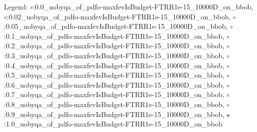 Legend: {{}$\circ$}:0.0\_uobyqa\_of\_pdfo-maxfevIsBudget-FTRR1e-15\_10000D\_on\_bbob, {{}$\circ$}:0.02\_uobyqa\_of\_pdfo-maxfevIsBudget-FTRR1e-15\_10000D\_on\_bbob, {{}$\circ$}:0.05\_uobyqa\_of\_pdfo-maxfevIsBudget-FTRR1e-15\_10000D\_on\_bbob, {{}$\circ$}:0.1\_uobyqa\_of\_pdfo-maxfevIsBudget-FTRR1e-15\_10000D\_on\_bbob, {{}$\circ$}:0.2\_uobyqa\_of\_pdfo-maxfevIsBudget-FTRR1e-15\_10000D\_on\_bbob, {{}$\circ$}:0.3\_uobyqa\_of\_pdfo-maxfevIsBudget-FTRR1e-15\_10000D\_on\_bbob, {{}$\circ$}:0.4\_uobyqa\_of\_pdfo-maxfevIsBudget-FTRR1e-15\_10000D\_on\_bbob, {{}$\circ$}:0.5\_uobyqa\_of\_pdfo-maxfevIsBudget-FTRR1e-15\_10000D\_on\_bbob, {{}$\circ$}:0.6\_uobyqa\_of\_pdfo-maxfevIsBudget-FTRR1e-15\_10000D\_on\_bbob, {{}$\circ$}:0.7\_uobyqa\_of\_pdfo-maxfevIsBudget-FTRR1e-15\_10000D\_on\_bbob, {{}$\circ$}:0.8\_uobyqa\_of\_pdfo-maxfevIsBudget-FTRR1e-15\_10000D\_on\_bbob, {{}$\circ$}:0.9\_uobyqa\_of\_pdfo-maxfevIsBudget-FTRR1e-15\_10000D\_on\_bbob, {{}$\star$}:1.0\_uobyqa\_of\_pdfo-maxfevIsBudget-FTRR1e-15\_10000D\_on\_bbob